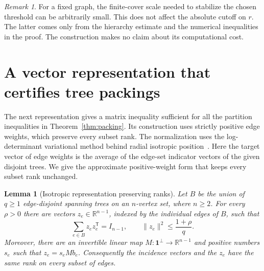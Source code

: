\documentclass[11pt]{amsart}
\newtheorem{lemma}[theorem]{Lemma}
\theoremstyle{definition}
\theoremstyle{remark}
\newtheorem{remark}[theorem]{Remark}
\numberwithin{equation}{section}
\begin{document}
\begin{remark}\label{rem:uniform-extraction}
For a fixed graph, the finite-cover scale needed to stabilize the
chosen threshold can be arbitrarily small. This does not affect the
absolute cutoff on \(r\). The latter comes only from the hierarchy
estimate and the numerical inequalities in the proof.
The construction makes no claim about its computational cost.
\end{remark}

\section{A vector representation that certifies tree packings}
\label{sec:auxiliary}

The next representation gives a matrix inequality sufficient for all the
partition inequalities in Theorem~\ref{thm:packing}. Its construction uses
strictly positive edge weights, which preserve every subset rank.
The normalization uses the log-determinant variational method behind
radial isotropic position~\cite[Section~2.2]{Barthe1998}. Here the target
vector of edge weights is the average of the edge-set indicator vectors
of the given disjoint trees. We give the approximate positive-weight form
that keeps every subset rank unchanged.

\begin{lemma}[Isotropic representation preserving ranks]
\label{lem:auxiliary-representation}
Let $B$ be the union of $q\geq1$ edge-disjoint spanning trees on an
$n$-vertex set, where $n\geq2$.  For every $\rho>0$ there are vectors
$z_e\in\mathbb R^{n-1}$, indexed by the individual edges of $B$, such that
\begin{equation}
 \sum_{e\in B}z_ez_e^{\mathsf T}=I_{n-1},
 \qquad \|z_e\|^2\leq\frac{1+\rho}{q}.
 \label{eq:auxiliary-isotropy}
\end{equation}
Moreover, there are an invertible linear map $M:\mathbf1^\perp\to
\mathbb R^{n-1}$ and positive numbers $s_e$ such that $z_e=s_eMb_e$.
Consequently the incidence vectors and the $z_e$ have the same rank on
every subset of edges.
\end{lemma}
\end{document}
